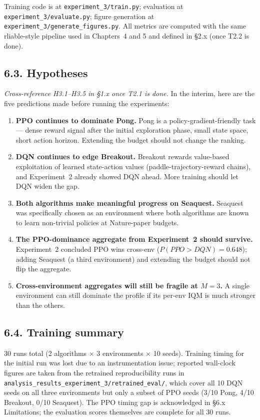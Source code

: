 \documentclass[11pt,a4paper]{article}
\newcommand{\fileline}[1]{\texttt{\small #1}}
\begin{document}
Training code is at \fileline{experiment\_3/train.py}; evaluation at
\fileline{experiment\_3/evaluate.py}; figure generation at
\fileline{experiment\_3/generate\_figures.py}. All metrics are computed
with the same rliable-style pipeline used in Chapters~4 and 5 and
defined in \S2.x (once T2.2 is done).

\subsection*{6.3. Hypotheses}

\emph{Cross-reference H3.1--H3.5 in \S1.x once T2.1 is done.} In the
interim, here are the five predictions made before running the
experiments:

\begin{enumerate}[leftmargin=*,label=H3.\arabic*.]
  \item \textbf{PPO continues to dominate Pong.} Pong is a
  policy-gradient-friendly task --- dense reward signal after the
  initial exploration phase, small state space, short action horizon.
  Extending the budget should not change the ranking.
  \item \textbf{DQN continues to edge Breakout.} Breakout rewards
  value-based exploitation of learned state-action values
  (paddle-trajectory-reward chains), and Experiment~2 already showed
  DQN ahead. More training should let DQN widen the gap.
  \item \textbf{Both algorithms make meaningful progress on Seaquest.}
  Seaquest was specifically chosen as an environment where both
  algorithms are known to learn non-trivial policies at Nature-paper
  budgets.
  \item \textbf{The PPO-dominance aggregate from Experiment~2 should
  survive.} Experiment~2 concluded PPO wins cross-env ($P(PPO>DQN)=0.648$);
  adding Seaquest (a third environment) and extending the budget should
  not flip the aggregate.
  \item \textbf{Cross-environment aggregates will still be fragile at
  $M=3$.} A single environment can still dominate the profile if its
  per-env IQM is much stronger than the others.
\end{enumerate}

\subsection*{6.4. Training summary}

30 runs total (2 algorithms $\times$ 3 environments $\times$ 10 seeds).
Training timing for the initial run was lost due to an instrumentation
issue; reported wall-clock figures are taken from the retrained
reproducibility runs in
\fileline{analysis\_results\_experiment\_3/retrained\_eval/}, which
cover all 10 DQN seeds on all three environments but only a subset of
PPO seeds (3/10 Pong, 4/10 Breakout, 0/10 Seaquest). The PPO timing gap
is acknowledged in \S6.x Limitations; the evaluation scores
themselves are complete for all 30 runs.
\end{document}
